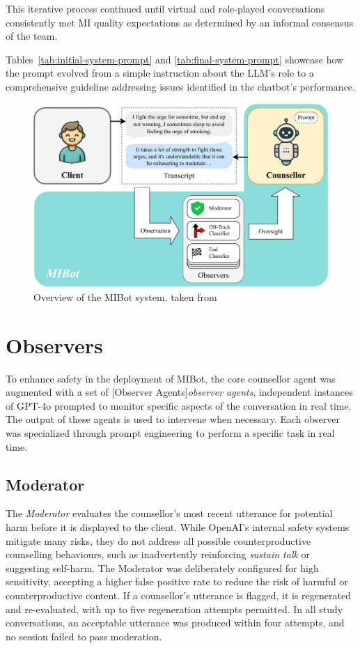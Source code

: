 This iterative process continued until virtual and role-played conversations consistently met MI quality expectations as determined by an informal consensus of the team.


Tables~\ref{tab:initial-system-prompt} and \ref{tab:final-system-prompt} showcase how the prompt evolved from a simple instruction about the LLM's role to a comprehensive guideline addressing issues identified in the chatbot's performance.




\begin{figure}[ht]
  \centering
  \includegraphics[width=0.9\linewidth]{fig/sysdiag.pdf} 
  \caption{Overview of the MIBot system, taken from \citet{mahmood-etal-2025-fully}}
  \label{fig:sysdiag}
\end{figure}

\section{Observers}
\label{sec:observers}
To enhance safety in the deployment of MIBot, the core counsellor agent was augmented with a set of [Observer Agents]\textit{observer agents}, independent instances of GPT-4o prompted to monitor specific aspects of the conversation in real time.  The output of these agents is used to intervene when necessary. Each observer was specialized through prompt engineering to perform a specific task in real time.

\subsection{Moderator}
The \textit{Moderator} evaluates the counsellor's most recent utterance for potential harm before it is displayed to the client. While OpenAI's internal safety systems mitigate many risks, they do not address all possible counterproductive counselling behaviours, such as inadvertently reinforcing \emph{sustain talk} or suggesting self-harm. The Moderator was deliberately configured for high sensitivity, accepting a higher false positive rate to reduce the risk of harmful or counterproductive content. If a counsellor's utterance is flagged, it is regenerated and re-evaluated, with up to five regeneration attempts permitted. In all study conversations, an acceptable utterance was produced within four attempts, and no session failed to pass moderation.

